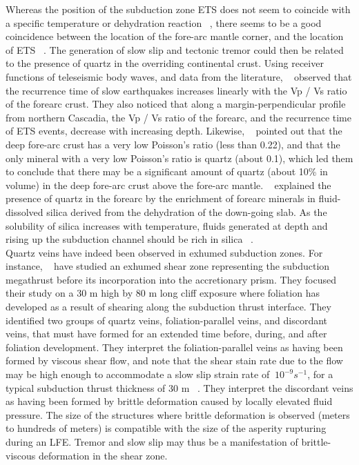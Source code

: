 \documentclass[draft]{agujournal2019}
\begin{document}
Whereas the position of the subduction zone ETS does not seem to coincide with a specific temperature or dehydration reaction ~\cite{PEA_2009}, there seems to be a good coincidence between the location of the fore-arc mantle corner, and the location of ETS ~\cite{HYN_2015}. The generation of slow slip and tectonic tremor could then be related to the presence of quartz in the overriding continental crust. Using receiver functions of teleseismic body waves, and data from the literature, ~ observed that the recurrence time of slow earthquakes increases linearly with the Vp / Vs ratio of the forearc crust. They also noticed that along a margin-perpendicular profile from northern Cascadia, the Vp / Vs ratio of the forearc, and the recurrence time of ETS events, decrease with increasing depth. Likewise, ~  pointed out that the deep fore-arc crust has a very low Poisson's ratio (less than 0.22), and that the only mineral with a very low Poisson's ratio is quartz (about 0.1), which led them to conclude that there may be a significant amount of quartz (about 10\% in volume) in the deep fore-arc crust above the fore-arc mantle. ~ explained the presence of quartz in the forearc by the enrichment of forearc minerals in fluid-dissolved silica derived from the dehydration of the down-going slab. As the solubility of silica increases with temperature, fluids generated at depth and rising up the subduction channel should be rich in silica ~\cite{HYN_2015}. \\

Quartz veins have indeed been observed in exhumed subduction zones. For instance, ~ have studied an exhumed shear zone representing the subduction megathrust before its incorporation into the accretionary prism. They focused their study on a 30 m high by 80 m long cliff exposure where foliation has developed as a result of shearing along the subduction thrust interface. They identified two groups of quartz veins, foliation-parallel veins, and discordant veins, that must have formed for an extended time before, during, and after foliation development. They interpret the foliation-parallel veins as having been formed by viscous shear flow, and note that the shear stain rate due to the flow may be high enough to accommodate a slow slip strain rate of $~10^{-9} s^{-1}$, for a typical subduction thrust thickness of 30 m ~\cite{ROW_2013}. They interpret the discordant veins as having been formed by brittle deformation caused by locally elevated fluid pressure. The size of the structures where brittle deformation is observed (meters to hundreds of meters) is compatible with the size of the asperity rupturing during an LFE. Tremor and slow slip may thus be a manifestation of brittle-viscous deformation in the shear zone. \\
\end{document}
